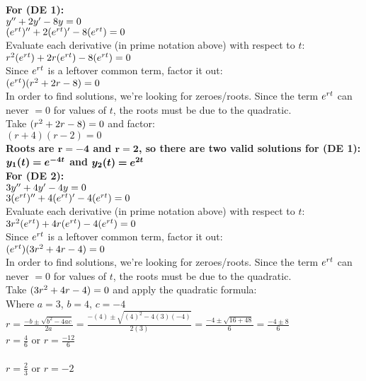 \documentclass{article}
\begin{document}
\begin{enumerate}
\begin{enumerate}
\textbf{For (DE 1):}\\
$y\sp{\prime\prime}+2y\sp\prime-8y=0$\\
$(e\sp{rt})\sp{\prime\prime}+2(e\sp{rt})\sp\prime-8(e\sp{rt})=0$\\
Evaluate each derivative (in prime notation above) with respect to $t$:\\
$r\sp{2}(e\sp{rt})+2r(e\sp{rt})-8(e\sp{rt})=0$\\
Since $e\sp{rt}$ is a leftover common term, factor it out:\\
$(e\sp{rt})(r\sp{2}+2r-8)=0$\\
In order to find solutions, we're looking for zeroes/roots. Since the term $e\sp{rt}$ can never $=0$ for values of $t$, the roots must be due to the quadratic.\\
Take $(r\sp{2}+2r-8)=0$ and factor:\\
$(r+4)(r-2)=0$\\

\textbf{Roots are $\bm{r=-4}$ and $\bm{r=2}$, so there are two valid solutions for (DE 1):}\\
\textbf{$\bm{y_{1}(t) = e\sp{-4t}}$ and $\bm{y_{2}(t) = e\sp{2t}}$}\\

\textbf{For (DE 2):}\\
$3y\sp{\prime\prime}+4y\sp\prime-4y=0$\\
$3(e\sp{rt})\sp{\prime\prime}+4(e\sp{rt})\sp\prime-4(e\sp{rt})=0$\\
Evaluate each derivative (in prime notation above) with respect to $t$:\\
$3r\sp{2}(e\sp{rt})+4r(e\sp{rt})-4(e\sp{rt})=0$\\
Since $e\sp{rt}$ is a leftover common term, factor it out:\\
$(e\sp{rt})(3r\sp{2}+4r-4)=0$\\
In order to find solutions, we're looking for zeroes/roots. Since the term $e\sp{rt}$ can never $=0$ for values of $t$, the roots must be due to the quadratic.\\
Take $(3r\sp{2}+4r-4)=0$ and apply the quadratic formula:\\
Where $a=3$, $b=4$, $c=-4$\\
$r=\frac{-b\pm\sqrt{b^2-4ac}}{2a}=\frac{-(4)\pm\sqrt{(4)^2-4(3)(-4)}}{2(3)}=\frac{-4\pm\sqrt{16+48}}{6}=\frac{-4\pm8}{6}$\\
$r=\frac{4}{6}$ or $r=\frac{-12}{6}$\\\\
$r=\frac{2}{3}$ or $r=-2$\\


\end{enumerate}
\end{enumerate}
\end{document}
